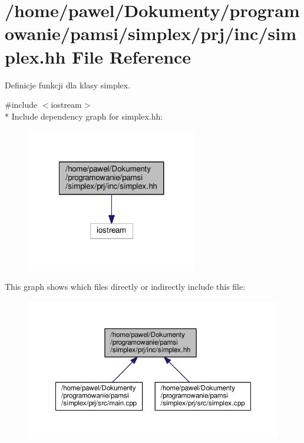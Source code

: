 \hypertarget{simplex_8hh}{\section{/home/pawel/\-Dokumenty/programowanie/pamsi/simplex/prj/inc/simplex.hh File Reference}
\label{simplex_8hh}
}


Definicje funkcji dla klasy simplex.  


{\ttfamily \#include $<$iostream$>$}\\*
Include dependency graph for simplex.\-hh\-:\nopagebreak
\begin{figure}[H]
\begin{center}
\leavevmode
\includegraphics[width=212pt]{simplex_8hh__incl}
\end{center}
\end{figure}
This graph shows which files directly or indirectly include this file\-:\nopagebreak
\begin{figure}[H]
\begin{center}
\leavevmode
\includegraphics[width=350pt]{simplex_8hh__dep__incl}
\end{center}
\end{figure}
